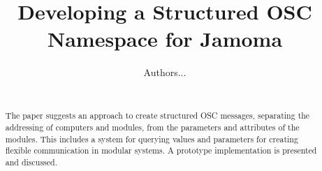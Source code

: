 \documentclass{sig-alternate}
\begin{document}
%

\title{Developing a Structured OSC Namespace for Jamoma}
\subtitle{}
%
%

%

\author{
%
\alignauthor Authors... \\
       \\
}

\maketitle
\begin{abstract}

The paper suggests an approach to create structured OSC messages, separating the addressing of computers and modules, from the parameters and attributes of the modules. This includes a system for querying values and parameters for creating flexible communication in modular systems. A prototype implementation is presented and discussed.

\end{abstract}
\end{document}
